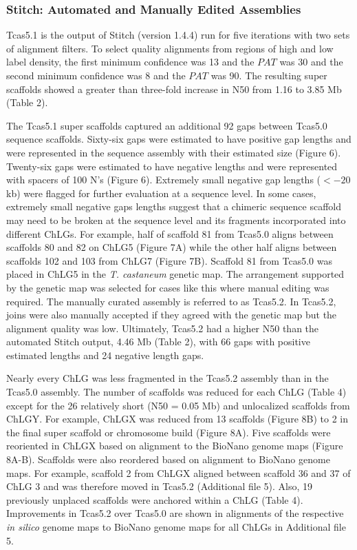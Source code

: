 \documentclass{bmcart}
\begin{document}
\subsubsection*{Stitch: Automated and Manually Edited Assemblies}

Tcas5.1 is the output of Stitch (version 1.4.4) run for five iterations with two sets of alignment filters. To select quality alignments from regions of high and low label density, the first minimum confidence was 13 and the $PAT$ was 30 and the second minimum confidence was 8 and the $PAT$ was 90. The resulting super scaffolds showed a greater than three-fold increase in N50 from 1.16 to 3.85 Mb (Table 2). 

The Tcas5.1 super scaffolds captured an additional 92 gaps between Tcas5.0 sequence scaffolds. Sixty-six gaps were estimated to have positive gap lengths and were represented in the sequence assembly with their estimated size (Figure 6). Twenty-six gaps were estimated to have negative lengths and were represented with spacers of 100 N's (Figure 6). Extremely small negative gap lengths ($< -20$ kb) were flagged for further evaluation at a sequence level. In some cases, extremely small negative gaps lengths suggest that a chimeric sequence scaffold may need to be broken at the sequence level and its fragments incorporated into different ChLGs. For example, half of scaffold 81 from Tcas5.0 aligns between scaffolds 80 and 82 on ChLG5 (Figure 7A) while the other half aligns between scaffolds 102 and 103 from ChLG7 (Figure 7B). Scaffold 81 from Tcas5.0 was placed in ChLG5 in the \textit{T. castaneum} genetic map. The arrangement supported by the genetic map was selected for cases like this where manual editing was required. The manually curated assembly is referred to as Tcas5.2. In Tcas5.2, joins were also manually accepted if they agreed with the genetic map but the alignment quality was low. Ultimately, Tcas5.2 had a higher N50 than the automated Stitch output, 4.46 Mb (Table 2), with 66 gaps with positive estimated lengths and 24 negative length gaps. 

Nearly every ChLG was less fragmented in the Tcas5.2 assembly than in the Tcas5.0 assembly. The number of scaffolds was reduced for each ChLG (Table 4) except for the 26 relatively short (N50 = 0.05 Mb) and unlocalized scaffolds from ChLGY. For example, ChLGX was reduced from 13 scaffolds (Figure 8B) to 2 in the final super scaffold or chromosome build (Figure 8A). Five scaffolds were reoriented in ChLGX based on alignment to the BioNano genome maps (Figure 8A-B). Scaffolds were also reordered based on alignment to BioNano genome maps. For example, scaffold 2 from ChLGX aligned between scaffold 36 and 37 of ChLG 3 and was therefore moved in Tcas5.2 (Additional file 5). Also, 19 previously unplaced scaffolds were anchored within a ChLG (Table 4). Improvements in Tcas5.2 over Tcas5.0 are shown in alignments of the respective \textit{in silico} genome maps to BioNano genome maps  for all ChLGs in Additional file 5.
\end{document}

